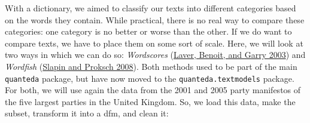 \documentclass[
]{book}
\begin{document}
With a dictionary, we aimed to classify our texts into different categories based on the words they contain. While practical, there is no real way to compare these categories: one category is no better or worse than the other. If we do want to compare texts, we have to place them on some sort of scale. Here, we will look at two ways in which we can do so: \emph{Wordscores} (\protect\hyperlink{ref-Laver2003a}{Laver, Benoit, and Garry 2003}) and \emph{Wordfish} (\protect\hyperlink{ref-Slapin2008a}{Slapin and Proksch 2008}). Both methods used to be part of the main \texttt{quanteda} package, but have now moved to the \texttt{quanteda.textmodels} package. For both, we will use again the data from the 2001 and 2005 party manifestos of the five largest parties in the United Kingdom. So, we load this data, make the subset, transform it into a dfm, and clean it:
\end{document}
